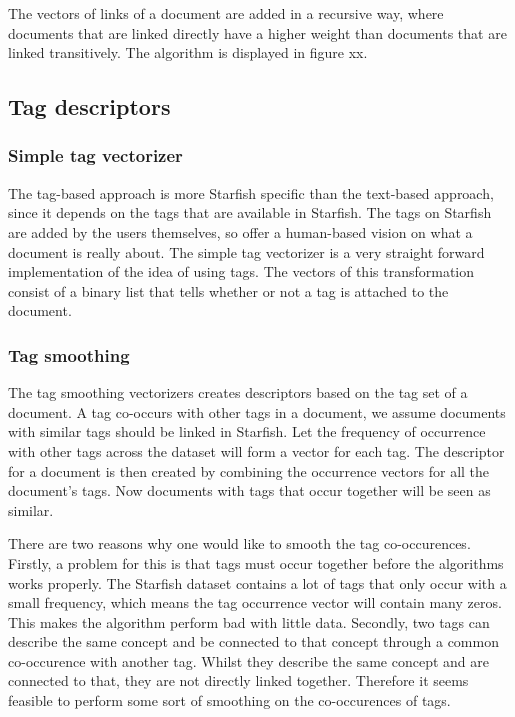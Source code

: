 The vectors of links of a document are added in a recursive way, where
documents that are linked directly have a higher weight than documents that are
linked transitively. The algorithm is displayed in figure xx.

\subsection{Tag descriptors}
\subsubsection{Simple tag vectorizer}
The tag-based approach is more Starfish specific than the text-based approach,
since it depends on the tags that are available in Starfish. The tags on
Starfish are added by the users themselves, so offer a human-based vision on
what a document is really about. The simple tag vectorizer is a very straight
forward implementation of the idea of using tags. The vectors of this
transformation consist of a binary list that tells whether or not a tag is
attached to the document. 

\subsubsection{Tag smoothing}
The tag smoothing vectorizers creates descriptors based on the tag set of a
document. A tag co-occurs with other tags in a document, we assume documents
with similar tags should be linked in Starfish. Let the frequency of occurrence
with other tags across the dataset will form a vector for each tag. The
descriptor for a document is then created by combining the occurrence vectors
for all the document's tags. Now documents with tags that occur together will
be seen as similar.

There are two reasons why one would like to smooth the tag co-occurences.
Firstly, a problem for this is that tags must occur together before the
algorithms works properly. The Starfish dataset contains a lot of tags that
only occur with a small frequency, which means the tag occurrence vector will
contain many zeros. This makes the algorithm perform bad with little data.
Secondly, two tags can describe the same concept and be connected to that
concept through a common co-occurence with another tag. Whilst they describe
the same concept and are connected to that, they are not directly linked
together. Therefore it seems feasible to perform some sort of smoothing on the
co-occurences of tags.

